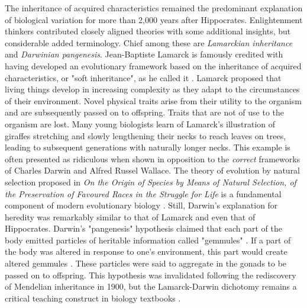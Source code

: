 The inheritance of acquired characteristics remained the predominant explanation of biological variation for more than 2,000 years after Hippocrates. Enlightenment thinkers contributed closely aligned theories with some additional insights, but considerable added terminology. Chief among these are \textit{Lamarckian inheritance} and \textit{Darwinian pangenesis}. Jean-Baptiste Lamarck is famously credited with having developed an evolutionary framework based on the inheritance of acquired characteristics, or "soft inheritance", as he called it  \cite{lamarck_zoological_1914}. Lamarck proposed that living things develop in increasing complexity as they adapt to the circumstances of their environment. Novel physical traits arise from their utility to the organism and are subsequently passed on to offspring. Traits that are not of use to the organism are lost. Many young biologists learn of Lamarck's illustration of giraffes stretching and slowly lengthening their necks to reach leaves on trees, leading to subsequent generations with naturally longer necks. This example is often presented as ridiculous when shown in opposition to the \textit{correct} frameworks of Charles Darwin and Alfred Russel Wallace. The theory of evolution by natural selection proposed in \textit{On the Origin of Species by Means of Natural Selection, of the Preservation of Favoured Races in the Struggle for Life} is a fundamental component of modern evolutionary biology \cite{darwin_origin_1936}. Still, Darwin's explanation for heredity was remarkably similar to that of Lamarck and even that of Hippocrates. Darwin's "pangenesis" hypothesis claimed that each part of the body emitted particles of heritable information called "gemmules" \cite{darwin_variation_2010}.  If a part of the body was altered in response to one's environment, this part would create altered gemmules \cite{darwin_pangenesis_1871}. These particles were said to aggregate in the gonads to be passed on to offspring.  This hypothesis was invalidated following the rediscovery of Mendelian inheritance in 1900, but the Lamarck-Darwin dichotomy remains a critical teaching construct in biology textbooks \cite{holterhoff_history_2014} \cite{zirkle_inheritance_1935}.


